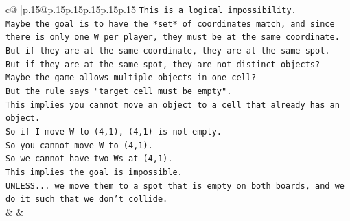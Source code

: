 \documentclass{article}
\begin{document}
{\begin{supertabular}{c@{$\;$}|p{.15\linewidth}@{}p{.15\linewidth}p{.15\linewidth}p{.15\linewidth}p{.15\linewidth}p{.15\linewidth}}
{{{\texttt{This is a logical impossibility.} \\
\texttt{Maybe the goal is to have the *set* of coordinates match, and since there is only one W per player, they must be at the same coordinate.} \\
\texttt{But if they are at the same coordinate, they are at the same spot.} \\
\texttt{But if they are at the same spot, they are not distinct objects?} \\
\texttt{Maybe the game allows multiple objects in one cell?} \\
\texttt{But the rule says "target cell must be empty".} \\
\texttt{This implies you cannot move an object to a cell that already has an object.} \\
\texttt{So if I move W to (4,1), (4,1) is not empty.} \\
\texttt{So you cannot move W to (4,1).} \\
\texttt{So we cannot have two Ws at (4,1).} \\
\texttt{This implies the goal is impossible.} \\
\texttt{UNLESS... we move them to a spot that is empty on both boards, and we do it such that we don't collide.} \\
            }
        }
    }
    & & \\ \\


\end{supertabular}}
\end{document}
